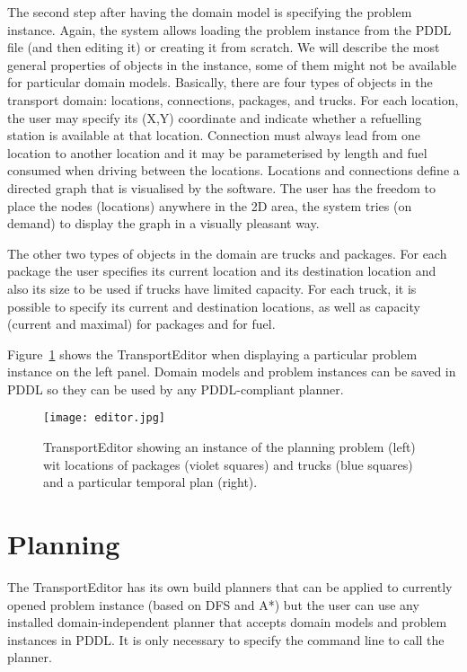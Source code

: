 \documentclass[letterpaper]{article}
\begin{document}
The second step after having the domain model is specifying the problem instance. Again, the system allows loading the problem instance from the PDDL file (and then editing it) or creating it from scratch. We will describe the most general properties of objects in the instance, some of them might not be available for particular domain models. Basically, there are four types of objects in the transport domain: locations, connections, packages, and trucks. For each location, the user may specify its (X,Y) coordinate and indicate whether a refuelling station is available at that location. Connection must always lead from one location to another location and it may be parameterised by length and fuel consumed when driving between the locations. Locations and connections define a directed graph that is visualised by the software. The user has the freedom to place the nodes (locations) anywhere in the 2D area, the system tries (on demand) to display the graph in a visually pleasant way.

The other two types of objects in the domain are trucks and packages. For each package the user specifies its current location and its destination location and also its size to be used if trucks have limited capacity. For each truck, it is possible to specify its current and destination locations, as well as capacity (current and maximal) for packages and for fuel.

Figure~\ref{fig:editor} shows the TransportEditor when displaying a particular problem instance on the left panel. Domain models and problem instances can be saved in PDDL so they can be used by any PDDL-compliant planner.

\begin{figure}[]
        \centering
        \texttt{[image: editor.jpg]}
        \caption{TransportEditor showing an instance of the planning problem (left) wit locations of packages (violet squares)  and trucks (blue squares) and a particular temporal plan (right).}
    \label{fig:editor}
\end{figure}

\section{Planning}
The TransportEditor has its own build planners that can be applied to currently opened problem instance (based on DFS and A*) but the user can use any installed domain-independent planner that accepts domain models and problem instances in PDDL. It is only necessary to specify the command line to call the planner.
\end{document}
